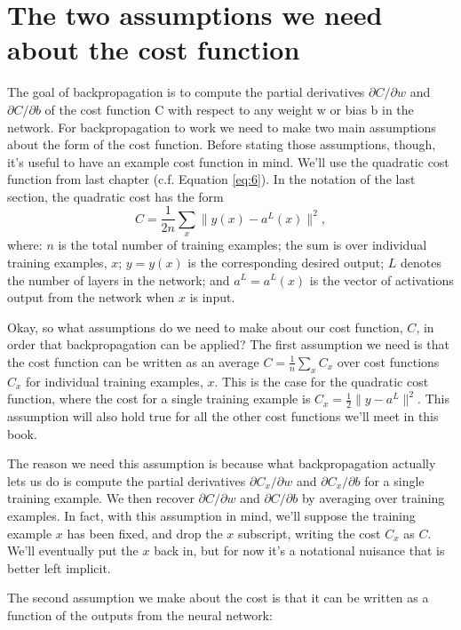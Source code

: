 \documentclass[a4paper,twoside,10pt]{book}
\begin{document}
\section{The two assumptions we need about the cost function}
The goal of backpropagation is to compute the partial derivatives $\partial{}C/\partial{}w$ and $\partial{}C/\partial{}b$ of the cost function C with respect to any weight w or bias b in the network. For backpropagation to work we need to make two main assumptions about the form of the cost function. Before stating those assumptions, though, it's useful to have an example cost function in mind. We'll use the quadratic cost function from last chapter (c.f. Equation \ref{eq:6}). In the notation of the last section, the quadratic cost has the form
\begin{equation}
C = \frac{1}{2n} \sum_x \|y(x)-a^L(x)\|^2,
\label{eq:26}
\end{equation}
where: $n$ is the total number of training examples; the sum is over individual training examples, $x$; $y=y(x)$ is the corresponding desired output; $L$ denotes the number of layers in the network; and $a^L=a^L(x)$ is the vector of activations output from the network when $x$ is input.

Okay, so what assumptions do we need to make about our cost function, $C$, in order that backpropagation can be applied? The first assumption we need is that the cost function can be written as an average $C=\frac1n\sum_xC_x$ over cost functions $C_x$ for individual training examples, $x$. This is the case for the quadratic cost function, where the cost for a single training example is $C_x=\frac12\|y-a^L\|^2$. This assumption will also hold true for all the other cost functions we'll meet in this book.

The reason we need this assumption is because what backpropagation actually lets us do is compute the partial derivatives $\partial{}C_x/\partial{}w$ and $\partial{}C_x/\partial{}b$ for a single training example. We then recover $\partial{}C/\partial{}w$ and $\partial{}C/\partial{}b$ by averaging over training examples. In fact, with this assumption in mind, we'll suppose the training example $x$ has been fixed, and drop the $x$ subscript, writing the cost $C_x$ as $C$. We'll eventually put the $x$ back in, but for now it's a notational nuisance that is better left implicit.

The second assumption we make about the cost is that it can be written as a function of the outputs from the neural network:
\end{document}
